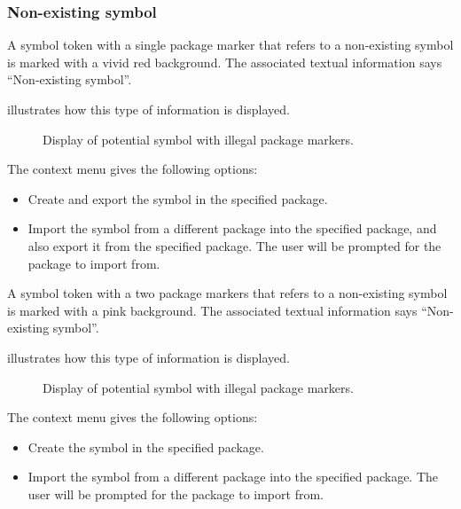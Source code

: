\subsubsection{Non-existing symbol}

A symbol token with a single package marker that refers to a
non-existing symbol is marked with a vivid red background.  The
associated textual information says ``Non-existing symbol''.  

 illustrates how this type of
information is displayed.

\begin{figure}
\begin{center}
\end{center}
\caption{\label{fig-non-existing-symbol}
Display of potential symbol with illegal package markers.}
\end{figure}

The context menu gives the following options:

\begin{itemize}
\item Create and export the symbol in the specified package.
\item Import the symbol from a different package into the specified
  package, and also export it from the specified package.  The user
  will be prompted for the package to import from.
\end{itemize}

A symbol token with a two package markers that refers to a
non-existing symbol is marked with a pink background.  The
associated textual information says ``Non-existing symbol''.  

 illustrates how
this type of information is displayed.

\begin{figure}
\begin{center}
\end{center}
\caption{\label{fig-non-existing-symbol-two-package-markers}
Display of potential symbol with illegal package markers.}
\end{figure}

The context menu gives the following options:

\begin{itemize}
\item Create the symbol in the specified package.
\item Import the symbol from a different package into the specified
  package.  The user will be prompted for the package to import from.
\end{itemize}

